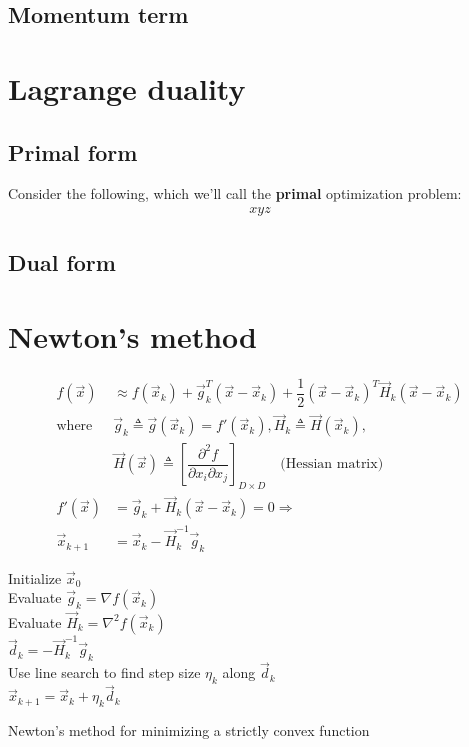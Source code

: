 \subsection{Momentum term}


\section{Lagrange duality}


\subsection{Primal form}
Consider the following, which we'll call the \textbf{primal} optimization problem:
\begin{eqnarray}
xyz
\end{eqnarray}


\subsection{Dual form}


\section{Newton's method}
\label{sec:Newtons-method}
\begin{align}
f(\vec{x})& \approx f(\vec{x}_k)+\vec{g}_k^T(\vec{x}-\vec{x}_k)+\dfrac{1}{2}(\vec{x}-\vec{x}_k)^T\vec{H}_k(\vec{x}-\vec{x}_k) \nonumber \\
\text{where } & \vec{g}_k \triangleq \vec{g}(\vec{x}_k)=f'(\vec{x}_k), \vec{H}_k \triangleq \vec{H}(\vec{x}_k), \nonumber \\
              & \vec{H}(\vec{x}) \triangleq \left[\dfrac{\partial^2 f}{\partial x_i \partial x_j}\right]_{D \times D} \quad \text{(Hessian matrix)} \nonumber \\
f'(\vec{x})& = \vec{g}_k+\vec{H}_k(\vec{x}-\vec{x}_k)=0 \Rightarrow  \label{eqn:newton-stationary-point} \\
\vec{x}_{k+1}& = \vec{x}_k-\vec{H}_k^{-1}\vec{g}_k
\end{align}

\begin{algorithm}[htbp]
    Initialize $\vec{x}_0$ \\
	
	 {
        Evaluate $\vec{g}_k=\nabla f(\vec{x}_k)$ \\
        Evaluate $\vec{H}_k=\nabla^2 f(\vec{x}_k)$ \\
        $\vec{d}_k=-\vec{H}_k^{-1}\vec{g}_k$ \\
        Use line search to find step size $\eta_k$ along $\vec{d}_k$ \\
        $\vec{x}_{k+1}=\vec{x}_k+\eta_k\vec{d}_k$
	}
	
\caption{Newton’s method for minimizing a strictly convex function}
\end{algorithm}


